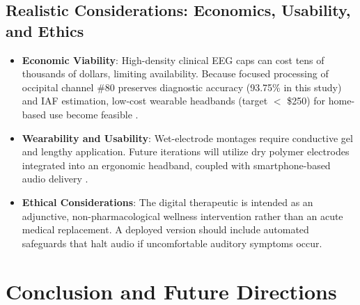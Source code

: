 \documentclass[12pt, a4paper]{report}
\begin{document}
\section{Realistic Considerations: Economics, Usability, and Ethics}
\label{sec:realistic_considerations}
\begin{itemize}
    \item \textbf{Economic Viability}: High-density clinical EEG caps can cost tens of thousands of dollars, limiting availability. Because focused processing of occipital channel \#80 preserves diagnostic accuracy (93.75\% in this study) and IAF estimation, low-cost wearable headbands (target $<$ \$250) for home-based use become feasible \cite{Muhammad2023}.
    \item \textbf{Wearability and Usability}: Wet-electrode montages require conductive gel and lengthy application. Future iterations will utilize dry polymer electrodes integrated into an ergonomic headband, coupled with smartphone-based audio delivery \cite{Petrusic2025,He2023}.
    \item \textbf{Ethical Considerations}: The digital therapeutic is intended as an adjunctive, non-pharmacological wellness intervention rather than an acute medical replacement. A deployed version should include automated safeguards that halt audio if uncomfortable auditory symptoms occur.
\end{itemize}

\chapter{Conclusion and Future Directions}
\label{ch:conclusion}
\end{document}
